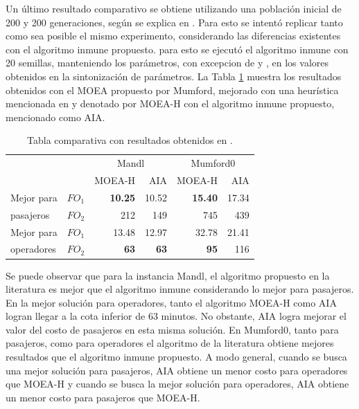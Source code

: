 Un último resultado comparativo se obtiene utilizando una población inicial de 200 y 200 generaciones, según se explica en \cite{john2014improved}. Para esto se intentó replicar tanto como sea posible el mismo experimento, considerando las diferencias existentes con el algoritmo inmune propuesto. para esto se ejecutó el algoritmo inmune con 20 semillas, manteniendo los parámetros, con excepcion de \popsize{} y \generaciones{}, en los valores obtenidos en la sintonización de parámetros. La Tabla \ref{tab:compliteratura} muestra los resultados obtenidos con el MOEA propuesto por Mumford, mejorado con una heurística mencionada en \cite{john2014improved} y denotado por MOEA-H con el algoritmo inmune propuesto, mencionado como AIA.

\begin{table}[!htb]
\begin{center}
\begin{tabular}{|l|c|r|r|r|r|}
\hline
 & & \multicolumn{2}{c|}{Mandl} & \multicolumn{2}{c|}{Mumford0} \\ \cline{3-6}
 & & MOEA-H & AIA & MOEA-H & AIA\\ \hline \hline
Mejor para & $FO_1$ & \textbf{10.25} & 10.52 & \textbf{15.40} & 17.34\\ \cline{2-6}
pasajeros & $FO_2$ &212 & 149 & 745 & 439\\ \hline
Mejor para & $FO_1$ & 13.48 & 12.97 & 32.78 & 21.41\\ \cline{2-6}
operadores & $FO_2$ & \textbf{63} & \textbf{63} & \textbf{95} & 116\\ \hline
\end{tabular}
\end{center}
\caption{Tabla comparativa con resultados obtenidos en \cite{john2014improved}.}
\label{tab:compliteratura}
\end{table}

Se puede observar que para la instancia Mandl, el algoritmo propuesto en la literatura es mejor que el algoritmo inmune considerando lo mejor para pasajeros. En la mejor solución para operadores, tanto el algoritmo MOEA-H como AIA logran llegar a la cota inferior de 63 minutos. No obstante, AIA logra mejorar el valor del costo de pasajeros en esta misma solución. En Mumford0, tanto para pasajeros, como para operadores el algoritmo de la literatura obtiene mejores resultados que el algoritmo inmune propuesto. A modo general, cuando se busca una mejor solución para pasajeros, AIA obtiene un menor costo para operadores que MOEA-H y cuando se busca la mejor solución para operadores, AIA obtiene un menor costo para pasajeros que MOEA-H.


